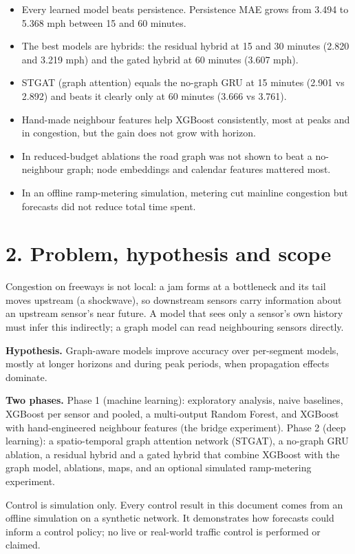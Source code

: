\documentclass[10pt,a4paper]{article}
\begin{document}
\begin{itemize}[nosep,leftmargin=*]
\item Every learned model beats persistence. Persistence MAE grows from 3.494 to 5.368 mph between 15 and 60 minutes.
\item The best models are hybrids: the residual hybrid at 15 and 30 minutes (2.820 and 3.219 mph) and the gated hybrid at 60 minutes (3.607 mph).
\item STGAT (graph attention) equals the no-graph GRU at 15 minutes (2.901 vs 2.892) and beats it clearly only at 60 minutes (3.666 vs 3.761).
\item Hand-made neighbour features help XGBoost consistently, most at peaks and in congestion, but the gain does not grow with horizon.
\item In reduced-budget ablations the road graph was not shown to beat a no-neighbour graph; node embeddings and calendar features mattered most.
\item In an offline ramp-metering simulation, metering cut mainline congestion but forecasts did not reduce total time spent.
\end{itemize}

\clearpage
\section*{2. Problem, hypothesis and scope}
Congestion on freeways is not local: a jam forms at a bottleneck and its tail moves upstream (a shockwave), so downstream sensors carry information about an upstream sensor's near future. A model that sees only a sensor's own history must infer this indirectly; a graph model can read neighbouring sensors directly.

\textbf{Hypothesis.} Graph-aware models improve accuracy over per-segment models, mostly at longer horizons and during peak periods, when propagation effects dominate.

\textbf{Two phases.} Phase 1 (machine learning): exploratory analysis, naive baselines, XGBoost per sensor and pooled, a multi-output Random Forest, and XGBoost with hand-engineered neighbour features (the bridge experiment). Phase 2 (deep learning): a spatio-temporal graph attention network (STGAT), a no-graph GRU ablation, a residual hybrid and a gated hybrid that combine XGBoost with the graph model, ablations, maps, and an optional simulated ramp-metering experiment.

\begin{callout}Control is simulation only. Every control result in this document comes from an offline simulation on a synthetic network. It demonstrates how forecasts could inform a control policy; no live or real-world traffic control is performed or claimed.\end{callout}
\end{document}
